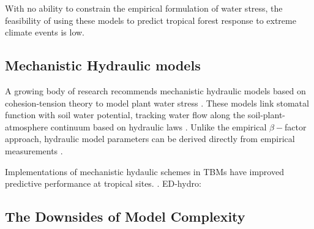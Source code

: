 With no ability to constrain the empirical formulation of water stress, the feasibility of using these models to predict tropical forest response to extreme climate events is low.  



\subsection*{Mechanistic Hydraulic models}

A growing body of research recommends mechanistic hydraulic models based on cohesion-tension theory to model plant water stress \citep{rogers_2017, fisher_2018, choat_2018}. These models link stomatal function with soil water potential, tracking water flow along the soil-plant-atmosphere continuum based on hydraulic laws \citep{sperry_2015, williams_1996}. Unlike the empirical $\beta-$factor approach, hydraulic model parameters can be derived directly from empirical measurements \citep{choat_2018}.

Implementations of mechanistic hydaulic schemes in TBMs have improved predictive performance at tropical sites.
.
ED-hydro: \citep{xu_2016, powell_2018, longo_2019}




\subsection*{The Downsides of Model Complexity}

